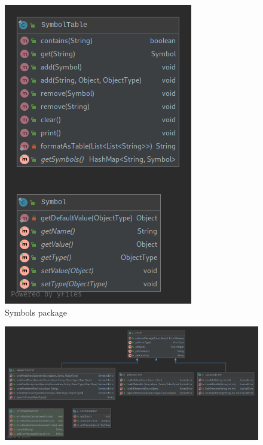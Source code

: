 \documentclass[
]{report}
\begin{document}
\begin{appendices}
\begin{figure}
		\includegraphics[width=\textwidth]{symbols-package-diagram}
		\caption{Symbols package}
		\label{fig:symbols-package-diagram}
	\end{figure}
	\begin{figure}
		\centering
		\includegraphics[width=\textwidth]{errors-package-diagram}

\end{figure}
\end{appendices}
\end{document}
